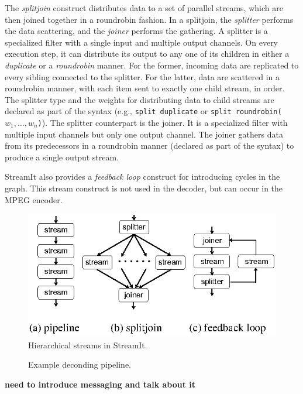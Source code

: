 The {\it splitjoin} construct distributes data to a set of parallel
streams, which are then joined together in a roundrobin fashion.  In
a splitjoin, the {\it splitter} performs the data scattering, and the
{\it joiner} performs the gathering. A splitter is a specialized
filter with a single input and  multiple output channels. On 
every execution step, it can distribute its output to any one of
its children in either a {\it duplicate} or a {\it roundrobin}
manner. For the former, incoming data are replicated to every
sibling connected to the splitter. For the latter, data are scattered
in a roundrobin manner, with each item sent to exactly one child
stream, in order.  The splitter type and the weights for distributing data to
child streams are declared as part of the syntax (e.g., \texttt{split
duplicate} or \texttt{split roundrobin($w_1,\ldots,w_n$)}). The
splitter counterpart is the joiner. It is a specialized filter with  
multiple input channels but only one output channel. The joiner
gathers data from its predecessors in a roundrobin manner (declared
as part of the syntax) to produce a single output stream.

StreamIt also provides a {\it feedback loop} construct for introducing
cycles in the graph. This stream construct is not used in the decoder,
but can occur in the MPEG encoder.


\begin{figure}[t]
\begin{center}
 \includegraphics[scale=1, angle=0]{./constructs-eg.eps}
 \caption{Hierarchical streams in StreamIt.}
 \label{fig:containers}
\end{center}
\end{figure}

\begin{figure}[t]
\begin{center}
\vspace{-12pt}
 \caption{Example deconding pipeline.}
 \label{fig:pipeline}
\end{center}
\end{figure}

{\bf need to introduce messaging and talk about it}
